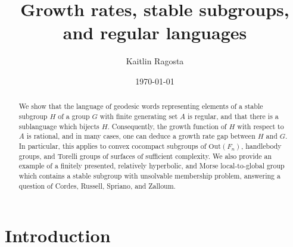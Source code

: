 \documentclass[11pt,letterpaper]{amsart}
\title{Growth rates, stable subgroups, and regular languages}
\author{Kaitlin Ragosta}
\date{\today}
\theoremstyle{definition}
\theoremstyle{plain}
\theoremstyle{TheoremNum}
\begin{document}
\begin{abstract}
    We show that the language of geodesic words representing elements of a stable subgroup $H$ of a group $G$ with finite generating set $A$ is regular, and that there is a sublanguage which bijects $H$. Consequently, the growth function of $H$ with respect to $A$ is rational, and in many cases, one can deduce a growth rate gap between $H$ and $G$. In particular, this applies to convex cocompact subgroups of $\mathrm{Out}(F_n)$, handlebody groups, and Torelli groups of surfaces of sufficient complexity. We also provide an example of a finitely presented, relatively hyperbolic, and Morse local-to-global group which contains a stable subgroup with unsolvable membership problem, answering a question of Cordes, Russell, Spriano, and Zalloum. 
\end{abstract}

\maketitle

\section{Introduction}
\end{document}
